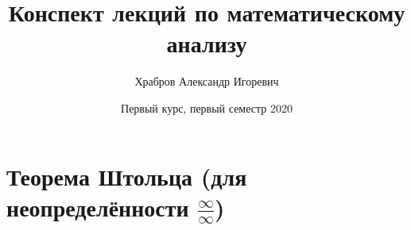 \documentclass[12pt,letterpaper]{report}
\title{Конспект лекций по математическому анализу}
\author{Храбров Александр Игоревич}
\date{Первый курс, первый семестр 2020}
\begin{document}
\fi
\maketitle
\tableofcontents
\newpage

\section{Теорема Штольца (для неопределённости $\frac \infty \infty$)}
\end{document}
